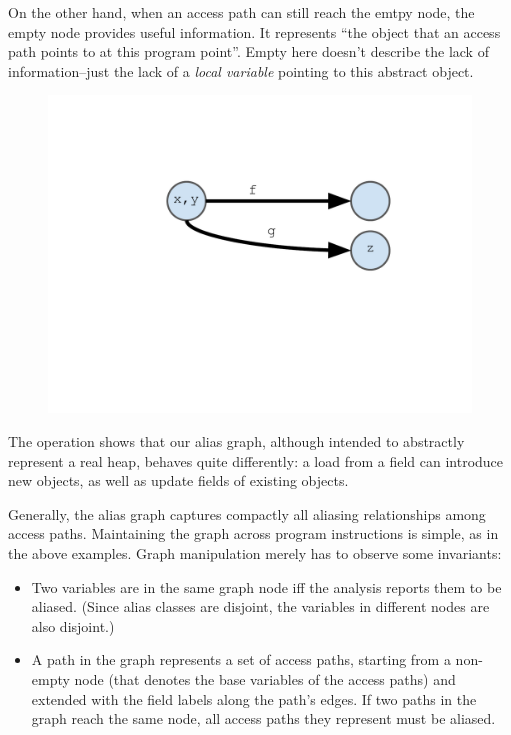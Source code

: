 On the other hand, when an access path can still reach
the emtpy node, the empty node provides useful information. It represents
``the object that an access path points to at this program point''. Empty here doesn't
describe the lack of information--just the lack of a \emph{local variable} pointing
to this abstract object.


\begin{figure}[h]
  \begin{minipage}[b]{\linewidth}
    \centering
    \includegraphics[trim={35mm 85mm 35mm 51mm},clip,width=0.8\linewidth]{assets/must-data/alias-graph3.pdf}
  \end{minipage}
\end{figure}

The  operation shows that our alias graph, although
intended to abstractly represent a real heap, behaves quite
differently: a load from a field can introduce new objects, as well as
update fields of existing objects.

Generally, the alias graph captures compactly all aliasing
relationships among access paths. Maintaining the graph across program
instructions is simple, as in the above examples. Graph manipulation
merely has to observe some invariants:

\begin{itemize}
  \item Two variables are in the same graph
node iff the analysis reports them to be aliased. (Since alias classes are disjoint, the
variables in different nodes are also disjoint.)
  \item A path in the graph
represents a set of access paths, starting from a non-empty node (that
denotes the base variables of the access paths) and extended with the
field labels along the path's edges. If two paths in the graph reach
    the same node, all access paths they represent must be aliased.
\end{itemize}

